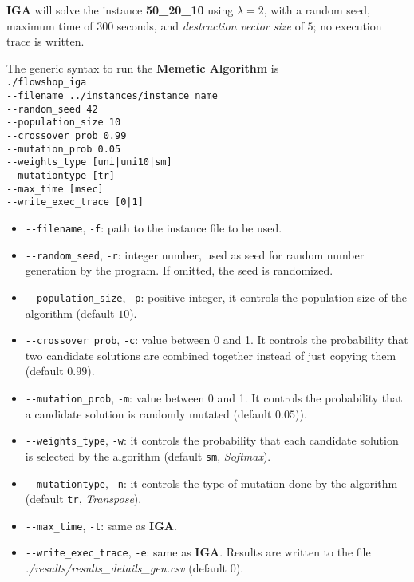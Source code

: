 \documentclass[
12pt,
a4paper,
oneside,
headinclude,
footinclude]{article}
\theoremstyle{definition} %
\begin{document}
\textbf{IGA} will solve the instance \textbf{50\_20\_10} using \textit{$\lambda = 2$}, with a random seed, maximum time of $300$ seconds, and \textit{destruction vector size} of $5$; no execution trace is written.


\newpage
The generic syntax to run the \textbf{Memetic Algorithm} is\\
\-\quad\texttt{./flowshop\_iga} \\
\-\quad\quad\texttt{-{}-filename ../instances/instance\_name} \\
\-\quad\quad\texttt{-{}-random\_seed 42} \\
\-\quad\quad\texttt{-{}-population\_size 10} \\
\-\quad\quad\texttt{-{}-crossover\_prob 0.99} \\
\-\quad\quad\texttt{-{}-mutation\_prob 0.05} \\
\-\quad\quad\texttt{-{}-weights\_type [uni|uni10|sm]} \\
\-\quad\quad\texttt{-{}-mutation\-type [tr]} \\
\-\quad\quad\texttt{-{}-max\_time [msec]} \\
\-\quad\quad\texttt{-{}-write\_exec\_trace [0|1]} \\


\begin{itemize}
    \item \texttt{-{}-filename}, \texttt{-f}: path to the instance file to be used.
    \item \texttt{-{}-random\_seed}, \texttt{-r}: integer number, used as seed for random number generation by the program. If omitted, the seed is randomized.
    \item \texttt{-{}-population\_size}, \texttt{-p}: positive integer, it controls the population size of the algorithm (default $10$).
    \item \texttt{-{}-crossover\_prob}, \texttt{-c}: value between 0 and 1. It controls the probability that two candidate solutions are combined together instead of just copying them (default $0.99$).
    \item \texttt{-{}-mutation\_prob}, \texttt{-m}: value between 0 and 1. It controls the probability that a candidate solution is randomly mutated (default $0.05$)).
    \item \texttt{-{}-weights\_type}, \texttt{-w}: it controls the probability that each candidate solution is selected by the algorithm (default \texttt{sm}, \textit{Softmax}).
    \item \texttt{-{}-mutation\-type}, \texttt{-n}: it controls the type of mutation done by the algorithm (default \texttt{tr}, \textit{Transpose}).
    \item \texttt{-{}-max\_time}, \texttt{-t}: same as \textbf{IGA}.
    \item \texttt{-{}-write\_exec\_trace}, \texttt{-e}: same as \textbf{IGA}. Results are written to the file \textit{./results/results\_details\_gen.csv} (default $0$).
\end{itemize}
\end{document}
